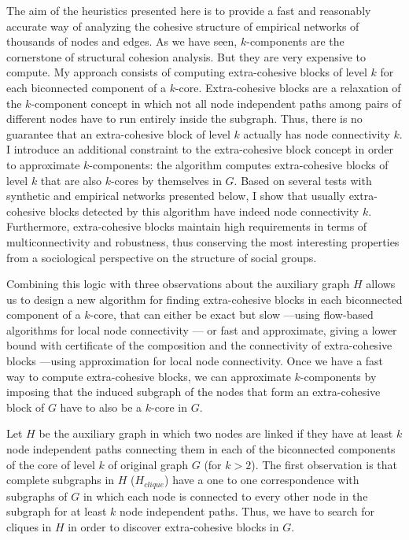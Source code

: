 The aim of the heuristics presented here is to provide a fast and reasonably accurate way of analyzing the cohesive structure of empirical networks of thousands of nodes and edges. As we have seen, $k$-components are the cornerstone of structural cohesion analysis. But they are very expensive to compute. My approach consists of computing extra-cohesive blocks of level $k$ for each biconnected component of a $k$-core. Extra-cohesive blocks are a relaxation of the $k$-component concept in which not all node independent paths among pairs of different nodes have to run entirely inside the subgraph. Thus, there is no guarantee that an extra-cohesive block of level $k$ actually has node connectivity $k$. I introduce an additional constraint to the extra-cohesive block concept in order to approximate $k$-components: the algorithm computes extra-cohesive blocks of level $k$ that are also $k$-cores by themselves in $G$. Based on several tests with synthetic and empirical networks presented below, I show that usually extra-cohesive blocks detected by this algorithm have indeed node connectivity $k$. Furthermore, extra-cohesive blocks maintain high requirements in terms of multiconnectivity and robustness, thus conserving the most interesting properties from a sociological perspective on the structure of social groups.

Combining this logic with three observations about the auxiliary graph $H$ allows us to design a new algorithm for finding extra-cohesive blocks in each biconnected component of a $k$-core, that can either be exact but slow ---using flow-based algorithms for local node connectivity \citep[Chapter 7]{brandes:2005}--- or fast and approximate, giving a lower bound with certificate of the composition and the connectivity of extra-cohesive blocks ---using \citet{white:2001b} approximation for local node connectivity. Once we have a fast way to compute extra-cohesive blocks, we can approximate $k$-components by imposing that the induced subgraph of the nodes that form an extra-cohesive block of $G$ have to also be a $k$-core in $G$.

Let $H$ be the auxiliary graph in which two nodes are linked if they have at least $k$ node independent paths connecting them in each of the biconnected components of the core of level $k$ of original graph $G$ (for $k > 2$). The first observation is that complete subgraphs in $H$ ($H_{clique}$) have a one to one correspondence with subgraphs of $G$ in which each node is connected to every other node in the subgraph for at least $k$ node independent paths. Thus, we have to search for cliques in $H$ in order to discover extra-cohesive blocks in $G$.

